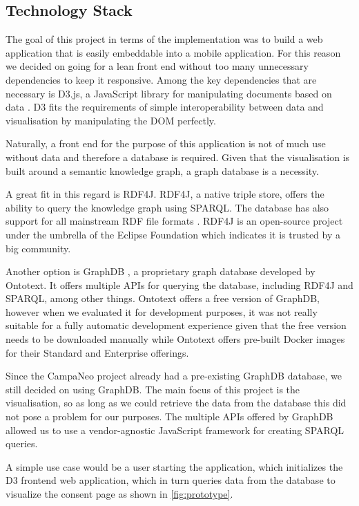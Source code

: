 \documentclass[../paper.tex]{subfiles}
\begin{document}
  \subsection{Technology Stack}

  The goal of this project in terms of the implementation was to
  build a web application that is easily embeddable into a mobile application.
  For this reason we decided on going for a lean front end without too many
  unnecessary dependencies to keep it responsive. Among the key dependencies that
  are necessary is D3.js, a JavaScript library for manipulating documents based
  on data \cite{d3}. D3 fits the requirements of simple interoperability between
  data and visualisation by manipulating the DOM perfectly.

  Naturally, a front end for the purpose of this application is not of much use
  without data and therefore a database is required. Given that the
  visualisation is built around a semantic knowledge graph, a graph database is
  a necessity.

  A great fit in this regard is RDF4J. RDF4J, a native triple
  store, offers the ability to query the knowledge graph using SPARQL. The
  database has also support for all mainstream RDF file formats \cite{rdf4j}.
  RDF4J is an open-source project under the umbrella of the Eclipse Foundation
  which indicates it is trusted by a big community.

  Another option is GraphDB \cite{graphdb}, a proprietary graph database developed by Ontotext.
  It offers multiple APIs for querying the database, including RDF4J and SPARQL,
  among other things. Ontotext offers a free version of GraphDB, however when
  we evaluated it for development purposes, it was not really suitable for a
  fully automatic development experience given that the free version needs to
  be downloaded manually while Ontotext offers pre-built Docker images for
  their Standard and Enterprise offerings.

  Since the CampaNeo project already had a pre-existing GraphDB database, we
  still decided on using GraphDB. The main focus of this project is the
  visualisation, so as long as we could retrieve the data from the database
  this did not pose a problem for our purposes. The multiple APIs offered by
  GraphDB allowed us to use a vendor-agnostic JavaScript framework for
  creating SPARQL queries.

  A simple use case would be a user starting the application, which initializes
  the D3 frontend web application, which in turn queries data from the database
  to visualize the consent page as shown in \cref{fig:prototype}.
\end{document}
